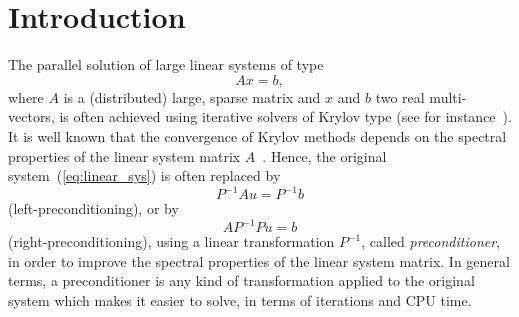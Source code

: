 % 
% 
% 
%  
%  
% 

\section{Introduction}
\label{chap:introduction}

The parallel solution of large linear systems of type
\begin{equation}
\label{eq:linear_sys}
A {x} = {b},
\end{equation}
where $A$ is a (distributed) large, sparse matrix and $x$ and $b$ two real
multi-vectors, is often achieved using iterative solvers of Krylov type (see for
instance~\cite{barret93templates}).
It is well known that the convergence of Krylov methods depends on 
the spectral properties of the linear system matrix
$A$~\cite{axelsson94iterative,saad96iterative,QSS}. Hence, the
original system~(\ref{eq:linear_sys}) is often replaced by
\[
P^{-1} A{u} = P^{-1} {b}
\]
(left-preconditioning), or by
\[
A P^{-1} P {u} = {b}
\]
(right-preconditioning), using a linear transformation $P^{-1}$,
called {\sl preconditioner}, in order to improve the spectral properties of
the linear system matrix. In general terms, a preconditioner is any
kind of transformation applied to the original system which makes it
easier to solve, in terms of iterations and CPU time.

